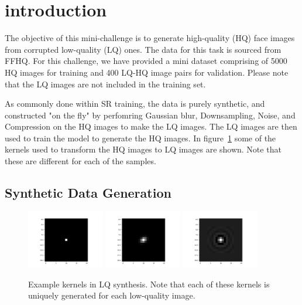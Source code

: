 \section{introduction}
\label{sec:introduction} %

The objective of this mini-challenge is to generate high-quality (HQ) face images from corrupted low-quality (LQ) ones. The data for this task is sourced from FFHQ. For this challenge, we have provided a mini dataset comprising of 5000 HQ images for training and 400 LQ-HQ image pairs for validation. Please note that the LQ images are not included in the training set.

As commonly done within SR training, the data is purely synthetic, and constructed "on the fly" by perfomring Gaussian blur, Downsampling, Noise, and Compression on the HQ images to make the LQ images. The LQ images are then used to train the model to generate the HQ images. In figure~\ref{fig:kernels} some of the kernels used to transform the HQ images to LQ images are shown. Note that these are different for each of the samples.


\subsection{Synthetic Data Generation}
\label{subsec:synthetic-data-generation}

\begin{minipage}{\textwidth}
    \centering
    \begin{figure}[H]
        \includegraphics[width=0.3\textwidth]{imgs/kernel1output.png}
        \includegraphics[width=0.3\textwidth]{imgs/kernel2output.png}
        \includegraphics[width=0.3\textwidth]{imgs/sinc_kerneloutput.png}
        \caption{Example kernels in LQ synthesis. Note that each of these kernels is uniquely generated for each low-quality image.}
        \label{fig:kernels}
    \end{figure}
\end{minipage}


